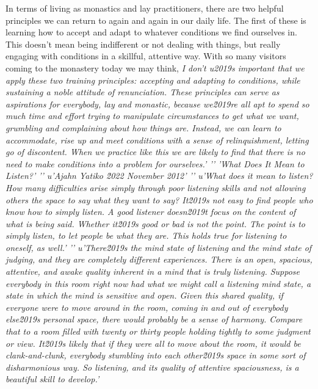 
In terms of living as monastics and lay practitioners, there are two 
helpful principles we can return to again and again in our daily life. 
The first of these is learning how to accept and adapt to whatever 
conditions we find ourselves in. This doesn't mean being indifferent or 
not dealing with things, but really engaging with conditions in a 
skillful, attentive way. With so many visitors coming to the monastery 
today we may think, \emph{I don't u2019s important that we apply these two training principles: accepting and adapting to conditions, while sustaining a noble attitude of renunciation. These principles can serve as aspirations for everybody, lay and monastic, because we\u2019re all apt to spend so much time and effort trying to manipulate circumstances to get what we want, grumbling and complaining about how things are. Instead, we can learn to accommodate, rise up and meet conditions with a sense of relinquishment, letting go of discontent. When we practice like this we are likely to find that there is no need to make conditions into a problem for ourselves.'
'\n'
'What Does It Mean to Listen?'
'\n'
u'Ajahn Yatiko \u2022 November 2012'
'\n'
u'What does it mean to listen? How many difficulties arise simply through poor listening skills and not allowing others the space to say what they want to say? It\u2019s not easy to find people who know how to simply listen. A good listener doesn\u2019t focus on the content of what is being said. Whether it\u2019s good or bad is not the point. The point is to simply listen, to let people be what they are. This holds true for listening to oneself, as well.'
'\n'
u'There\u2019s the mind state of listening and the mind state of judging, and they are completely different experiences. There is an open, spacious, attentive, and awake quality inherent in a mind that is truly listening. Suppose everybody in this room right now had what we might call a listening mind state, a state in which the mind is sensitive and open. Given this shared quality, if everyone were to move around in the room, coming in and out of everybody else\u2019s personal space, there would probably be a sense of harmony. Compare that to a room filled with twenty or thirty people holding tightly to some judgment or view. It\u2019s likely that if they were all to move about the room, it would be clank-and-clunk, everybody stumbling into each other\u2019s space in some sort of disharmonious way. So listening, and its quality of attentive spaciousness, is a beautiful skill to develop.'
}
